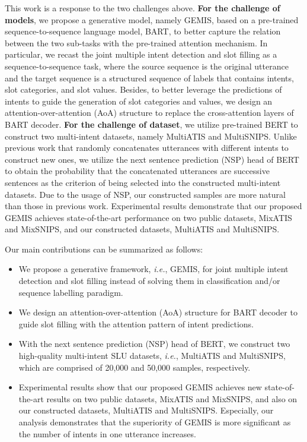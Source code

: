 \documentclass[11pt]{article}
\begin{document}
This work is a response to the two challenges above. \textbf{For the challenge of models}, we propose a generative model, namely GEMIS, based on a pre-trained sequence-to-sequence language model, BART\cite{DBLP:conf/acl/LewisLGGMLSZ20}, to better capture the relation between the two sub-tasks with the pre-trained attention mechanism. In particular, we recast the joint multiple intent detection and slot filling as a sequence-to-sequence task, where the source sequence is the original utterance and the target sequence is a structured sequence of labels that contains intents, slot categories, and slot values. Besides, to better leverage the predictions of intents to guide the generation of slot categories and values, we design an attention-over-attention (AoA) structure to replace the cross-attention layers of BART decoder. \textbf{For the challenge of dataset}, we utilize pre-trained BERT\cite{DBLP:conf/naacl/DevlinCLT19} to construct two multi-intent datasets, namely MultiATIS and MultiSNIPS. Unlike previous work\cite{DBLP:conf/emnlp/QinXCL20} that randomly concatenates utterances with different intents to construct new ones, we utilize the next sentence prediction (NSP) head of BERT to obtain the probability that the concatenated utterances are successive sentences as the criterion of being selected into the constructed multi-intent datasets. Due to the usage of NSP, our constructed samples are more natural than those in previous work\cite{DBLP:conf/emnlp/QinXCL20}. Experimental results demonstrate that our proposed GEMIS achieves state-of-the-art performance on two public datasets, MixATIS and MixSNIPS, and our constructed datasets, MultiATIS and MultiSNIPS.

Our main contributions can be summarized as follows:
\begin{itemize}
    \item We propose a generative framework, \emph{i.e.}, GEMIS, for joint multiple intent detection and slot filling instead of solving them in classification and/or sequence labelling paradigm.
    \item We design an attention-over-attention (AoA) structure for BART decoder to guide slot filling with the attention pattern of intent predictions.
    \item With the next sentence prediction (NSP) head of BERT, we construct two high-quality multi-intent SLU datasets, \emph{i.e.}, MultiATIS and MultiSNIPS, which are comprised of 20,000 and 50,000 samples, respectively.
    \item Experimental results show that our proposed GEMIS achieves new state-of-the-art results on two public datasets, MixATIS and MixSNIPS, and also on our constructed datasets, MultiATIS and MultiSNIPS. Especially, our analysis demonstrates that the superiority of GEMIS is more significant as the number of intents in one utterance increases.
\end{itemize}
\end{document}
